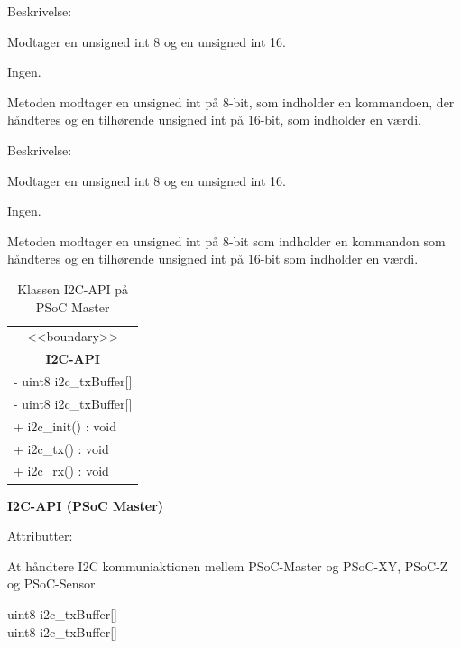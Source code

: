 \begin{labeling}{Beskrivelse:}
\item[void handleSPI(uint8, uint16)]
\item[Parametre:] Modtager en unsigned int 8 og en unsigned int 16.
\item [Returværdi:] Ingen.
\item [Beskrivelse:] Metoden modtager en unsigned int på 8-bit, som indholder en kommandoen, der håndteres og en tilhørende unsigned int på 16-bit, som indholder en værdi.
\end{labeling}

\begin{labeling}{Beskrivelse:}
\item[void handleI2C()]
\item[Parametre:]Modtager en unsigned int 8 og en unsigned int 16.
\item [Returværdi:] Ingen.
\item [Beskrivelse:] Metoden modtager en unsigned int på 8-bit som indholder en kommandon som håndteres og en tilhørende unsigned int på 16-bit som indholder en værdi.
\end{labeling}

\begin{table}[H]
    \centering
    \begin{tabular}{|l|}
    \hline
    \multicolumn{1}{|c|}{<<boundary>>} \\
    \multicolumn{1}{|c|}{\textbf{I2C-API}} \\
    \hline
    - uint8 i2c\_txBuffer[] \\
    - uint8 i2c\_txBuffer[] \\
    \hline
    + i2c\_init() : void \\
    + i2c\_tx() : void \\
    + i2c\_rx() : void \\
    \hline
    \end{tabular}
    \caption{Klassen I2C-API på PSoC Master}
    \label{tab:classI2cApiPSoCMaster}
\end{table}

{\centering\textbf{I2C-API (PSoC Master)}\par}

\begin{labeling}{Attributter:}
\item[Ansvar:] At håndtere I2C kommuniaktionen mellem PSoC-Master og PSoC-XY, PSoC-Z og PSoC-Sensor.
\item[Attributter:] uint8 i2c\_txBuffer[]\\
uint8 i2c\_txBuffer[]
\end{labeling}

